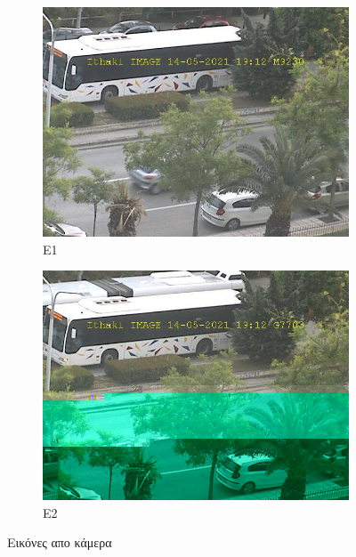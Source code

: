 \documentclass{article}
\begin{document}
\begin{figure}[H]
\begin{subfigure}{.5\textwidth}
  \centering
  \includegraphics[width=0.9\linewidth]{image_M9230.jpg}
  \caption{E1}
  \label{fig:sfig1}
\end{subfigure}%
\begin{subfigure}{.5\textwidth}
  \centering
  \includegraphics[width=0.9\linewidth]{image_G7703.jpg}
  \caption{E2}
  \label{fig:sfig2}
\end{subfigure}
\caption{Εικόνες απο κάμερα}
\label{fig:fig}
\end{figure}
\end{document}
